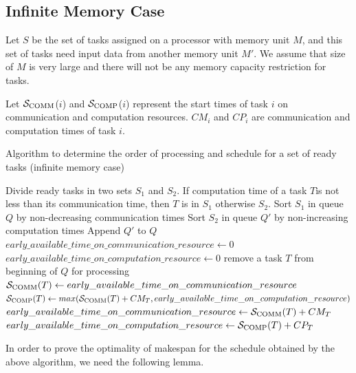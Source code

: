 \documentclass[runningheads]{llncs} %
\newcommand{\scomm}{\ensuremath{{\cal S}_{\text{COMM}}}}
\newcommand{\scomp}{\ensuremath{{\cal S}_{\text{COMP}}}}
\begin{document}
	
	\subsection{Infinite Memory Case}
	Let $S$ be the set of tasks assigned on a processor with memory unit $M$, and this set of tasks  need input data from another memory unit $M'$. We assume that size of $M$ is very large and there will not be any memory capacity restriction for tasks.
	
	Let \scomm($i$) and  \scomp($i$) represent the start times of task $i$ on communication and computation resources. $CM_i$ and $CP_i$ are communication and computation times of task $i$.
	
	\begin{algorithm}
	\caption{\label{alg:OrderOfExecutionInfinteMemory}Algorithm to determine the order of processing and schedule for a set of ready tasks (infinite memory case)}
	\begin{algorithmic}[1]
		\STATE Divide ready tasks in two sets $S_1$ and $S_2$. If computation time of a task $T$is not less than its communication time, then $T$ is in $S_1$ otherwise $S_2$.
		\STATE Sort $S_1$ in queue $Q$ by non-decreasing communication times
		\STATE Sort $S_2$ in queue $Q'$ by non-increasing computation times
		\STATE Append $Q'$ to $Q$
		\STATE $early\_available\_time\_on\_communication\_resource \gets 0$
		\STATE $early\_available\_time\_on\_computation\_resource \gets 0$
		\STATE remove a task $T$ from beginning of $Q$ for processing
		\STATE $\scomm(T) \gets  early\_available\_time\_on\_communication\_resource$
		\STATE $\scomp(T) \gets  max(\scomm(T) + CM_T, early\_available\_time\_on\_computation\_resource)$
		\STATE $early\_available\_time\_on\_communication\_resource \gets  \scomm(T) + CM_T$
		\STATE $early\_available\_time\_on\_computation\_resource \gets  \scomp(T) + CP_T$
		\ENDWHILE
	\end{algorithmic}
\end{algorithm}
	
In order to prove the optimality of makespan for the schedule obtained by the above algorithm, we need the following lemma.
\end{document}
